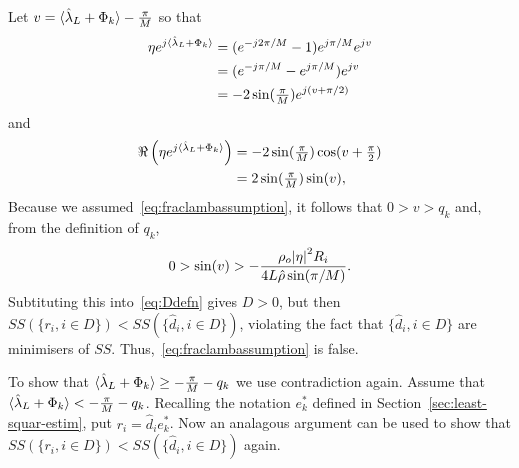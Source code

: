 \documentclass[journal]{IEEEtran}
\begin{document}
\begin{IEEEproof}
Let $v = \langle \hat{\lambda}_L + \Phi_k \rangle - \tfrac{\pi}{M}$ so that
\begin{align*}
\eta e^{j\langle \hat{\lambda}_L + \Phi_k \rangle} &= (e^{-j2\pi/M} - 1) e^{j \pi/M} e^{jv} \\
&= (e^{-j\pi/M} - e^{j\pi/M}) e^{jv} \\
&= -2 \sin(\tfrac{\pi}{M}) e^{j ( v + \pi/2) }
\end{align*}
and
\begin{align*}
\Re\left( \eta e^{j\langle \hat{\lambda}_L + \Phi_k \rangle}\right) &= -2 \sin(\tfrac{\pi}{M}) \cos(v + \tfrac{\pi}{2}) \\
 &= 2 \sin(\tfrac{\pi}{M}) \sin(v),
\end{align*}
Because we assumed~\eqref{eq:fraclambassumption}, it follows that $0 > v > q_k$ and, from the definition of $q_k$,
\[
0 > \sin(v) > -\frac{\rho_o {\vert \eta \vert}^2 R_i}{4 L \hat{\rho} \sin(\pi/M)}.
\]
Subtituting this into~\eqref{eq:Ddefn} gives $D > 0$, but then $SS(\{r_i, i \in D\}) < SS(\{\hat{d}_i, i \in D\})$, violating the fact that $\{\hat{d}_i, i \in D\}$ are minimisers of $SS$.  Thus,~\eqref{eq:fraclambassumption} is false.

To show that $\langle \hat{\lambda}_L + \Phi_k \rangle \geq -\frac{\pi}{M} - q_k$ we use contradiction again.  Assume that $\langle \hat{\lambda}_L + \Phi_k \rangle < -\frac{\pi}{M} - q_k$.  Recalling the notation $e_k^*$ defined in Section~\ref{sec:least-squar-estim}, put $r_i = \hat{d}_i e_k^*$.  Now an analagous argument can be used to show that $SS(\{r_i, i \in D\}) < SS(\{\hat{d}_i, i \in D\})$ again.

\end{IEEEproof}
\end{document}

